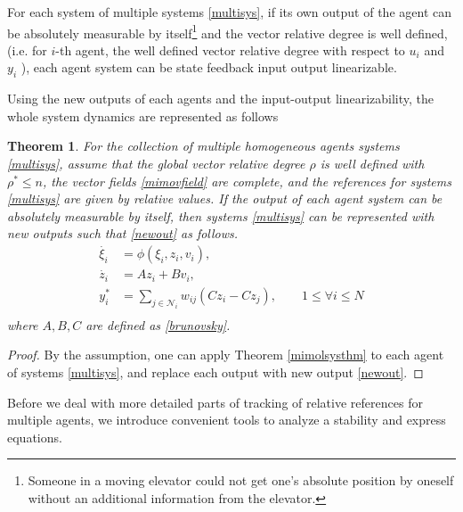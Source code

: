 \documentclass[11pt, a4paper, oneside, openany, reqno]{book}
\newtheorem{theorem}{Theorem}[chapter]
\theoremstyle{definition}
\theoremstyle{remark}
\numberwithin{equation}{chapter} %
\newcommand{\NBR}{\mathcal{N}}
\begin{document}
For each system of multiple systems \eqref{multisys}, 
if its own output of the agent can be absolutely measurable by itself\footnote
{Someone in a moving elevator could not get one's absolute position by oneself
without an additional information from the elevator.} 
and the vector relative degree is well defined, 
(i.e. for $ i $-th agent, the well defined vector relative degree with respect to $ u_i $ and $ y_i $ ),
each agent system can be state feedback input output linearizable.

Using the new outputs of each agents and the input-output linearizability, 
the whole system dynamics are represented as follows

\begin{theorem}\label{brusysthm}
	For the collection of multiple homogeneous agents systems \eqref{multisys}, 
	assume that the global vector relative degree $ \rho $ is well defined with $ \rho^* \leq n $, 
	the vector fields \eqref{mimovfield} are complete, 
	and the references for systems \eqref{multisys} 
	are given by relative values.
	If the output of each agent system can be absolutely measurable by itself,
	then systems \eqref{multisys} can be represented with new outputs such that \eqref{newout} as follows.
	\begin{equation}\begin{split}\label{brusys}
	\dot{\xi_i} &= \phi(\xi_i,z_i,v_i), \\
	\dot{z_i}&=Az_i+Bv_i, \\
	y_i^* & =\sum_{j \in \NBR_i}w_{ij}(Cz_i-Cz_j), \qquad  1 \leq \forall i \leq N\\
	\end{split}\end{equation} 
	where $ A,B,C $ are defined as \eqref{brunovsky}.
\end{theorem}

\begin{proof}
	By the assumption, one can apply Theorem \ref{mimolsysthm} 
	to each agent of systems \eqref{multisys}, 
	and replace each output with new output \eqref{newout}.
\end{proof}


Before we deal with more detailed parts of tracking of relative references for multiple agents, 
we introduce convenient tools to analyze a stability and express equations.
\end{document}
